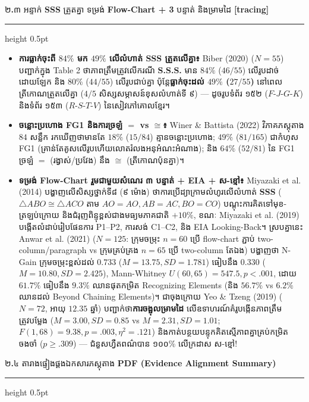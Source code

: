 \documentclass[a4paper,12pt]{article}
\newcommand{\en}[1]{{\TimesEn #1}}
\newcommand{\enbf}[1]{{\TimesEn\textbf{#1}}}
\newcommand{\tri}[1]{\ensuremath{\triangle #1}}
\newcommand{\cg}{\ensuremath{\cong}}
\newcommand{\subsectitle}[1]{{\muol\fontsize{11pt}{14.5pt}\selectfont #1}}
\newcommand{\subsec}[1]{%
  \needspace{1.6cm}%
  \vspace{4pt}%
  \subsectitle{#1}\par
  \vspace{2pt}\hrule height 0.5pt\vspace{3pt}%
}
\begin{document}
\subsec{២\enbf{.}៣ អន្ទាក់ \enbf{SSS} ត្រួតគ្នា ទម្រង់ \enbf{Flow-Chart + 3} បន្ទាត់ និងម្រាមដៃ \enbf{[tracing]}}

\begin{itemize}[leftmargin=0.50cm, topsep=2pt, itemsep=2.5pt, parsep=0pt]
  \item \textbf{ការធ្លាក់ចុះពី $84\%$ មក $49\%$ លើលំហាត់ \en{SSS} ត្រួតលើគ្នា៖} \en{Biber (2020)} ($N=55$) បញ្ជាក់ក្នុង \en{Table 2} ថាភាពត្រឹមត្រូវលើករណី \textbf{\en{S.S.S.}} មាន $84\%$ ($46/55$) លើរូបដាច់ដោយឡែក និង $80\%$ ($44/55$) លើរូបជាប់គ្នា ប៉ុន្តែ\textbf{ធ្លាក់ចុះដល់ $49\%$ ($27/55$)} នៅពេលត្រីកោណត្រួតលើគ្នា ($4/5$ សិស្សសម្ភាសន៍ខុសលំហាត់ទី ៩) — ដូចរូបទំព័រ ១៥២ ($F\text{-}J\text{-}G\text{-}K$) និងទំព័រ ១៥៣ ($R\text{-}S\text{-}T\text{-}V$) នៃសៀវភៅគោលខ្មែរ។
  \item \textbf{ចន្លោះប្រហោង \en{FG1} និងការច្រឡំ $=$ vs $\cg$៖} \en{Winer \& Battista (2022)} វិភាគភស្តុតាង $84$ សន្លឹក រកឃើញថាមានតែ $18\%$ ($15/84$) គ្មានចន្លោះប្រហោង; $49\%$ ($81/165$) ជាកំហុស \en{FG1} (គ្រាន់តែគូសលើរូបហើយលោតរំលងអនុអំណះអំណាង); និង $64\%$ ($52/81$) នៃ \en{FG1} ច្រឡំ $=$ (រង្វាស់/ប្រវែង) នឹង $\cg$ (ត្រីកោណប៉ុនគ្នា)។
  \item \textbf{ទម្រង់ \en{Flow-Chart} រួមជាមួយសំណេរ ៣ បន្ទាត់ + \en{EIA} + \en{[tracing]} ស-ខ្មៅ៖} \en{Miyazaki et al. (2014)} បង្ហាញលើសិស្សថ្នាក់ទី៨ (៩ ម៉ោង) ថាការប្រើដ្យាក្រាមលំហូរលើលំហាត់ \textbf{\en{SSS}} ($\tri{ABO}\cg\tri{ACO}$ តាម $AO=AO, AB=AC, BO=CO$) បណ្ដុះការគិតទៅមុខ-ត្រឡប់ក្រោយ និងជំរុញពិន្ទុខ្ពស់ជាងមធ្យមភាគជាតិ $+10\%$, ខណៈ \en{Miyazaki et al. (2019)} បង្កើតលំដាប់រៀបផែនការ \en{P1--P2}, ការសង់ \en{C1--C2}, និង \en{EIA Looking-Back}។ ស្របគ្នានេះ \en{Anwar et al. (2021)} ($N=125$: ក្រុមចម្រុះ $n=60$ ប្រើ \en{flow-chart} ភ្ជាប់ \en{two-column/paragraph} vs ក្រុមគ្រប់គ្រង $n=65$ ប្រើ \en{two-column} តែឯង) បង្ហាញថា \en{N-Gain} ក្រុមចម្រុះខ្ពស់ដល់ $0.733$ ($M=13.75, SD=1.781$) ធៀបនឹង $0.330$ ($M=10.80, SD=2.425$), \en{Mann-Whitney} $U(60,65)=547.5, p<.001$, ដោយ $61.7\%$ ធៀបនឹង $9.3\%$ ឈានផុតកម្រិត \en{Recognizing Elements} (និង $56.7\%$ vs $6.2\%$ ឈានដល់ \en{Beyond Chaining Elements})។ ជាចុងក្រោយ \en{Yeo \& Tzeng (2019)} ($N=72$, អាយុ $12.35$ ឆ្នាំ) បញ្ជាក់ថា\textbf{ការចង្អុលម្រាមដៃ \en{[tracing]}} លើឧទាហរណ៍គំរូបង្កើនភាពត្រឹមត្រូវបម្លែង ($M=3.00, SD=0.85$ vs $M=2.31, SD=1.01$; $F(1,68)=9.38, p=.003, \eta^2=.121$) និងកាត់បន្ថយបន្ទុកគិតស្មើភាពគ្នាគ្រប់កម្រិតចងចាំ ($p \ge .309$) — ជំនួសហ្វឺតពណ៌បាន ១០០\% លើក្រដាស ស-ខ្មៅ!
\end{itemize}

\subsec{២\enbf{.}៤ តារាងផ្ទៀងផ្គងឯកសារភស្តុតាង \enbf{PDF (Evidence Alignment Summary)}}
\end{document}

